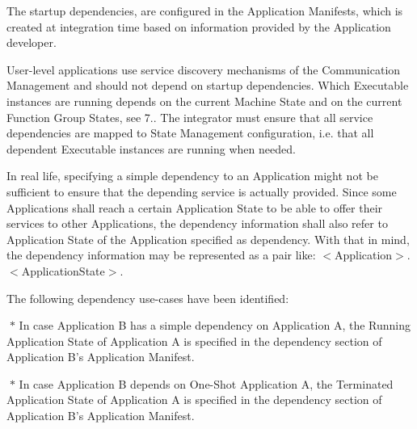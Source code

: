 \begin{DoxyItemize}
\begin{DoxyItemize}
The startup dependencies, are configured in the Application Manifests, which is created at integration time based on information provided by the Application developer.

User-\/level applications use service discovery mechanisms of the Communication Management and should not depend on startup dependencies. Which Executable instances are running depends on the current Machine State and on the current Function Group States, see 7.. The integrator must ensure that all service dependencies are mapped to State Management configuration, i.\+e. that all dependent Executable instances are running when needed.

In real life, specifying a simple dependency to an Application might not be sufficient to ensure that the depending service is actually provided. Since some Applications shall reach a certain Application State to be able to offer their services to other Applications, the dependency information shall also refer to Application State of the Application specified as dependency. With that in mind, the dependency information may be represented as a pair like\+: $<$\+Application$>$.$<$\+Application\+State$>$.

The following dependency use-\/cases have been identified\+:

$\ast$ In case Application B has a simple dependency on Application A, the Running Application State of Application A is specified in the dependency section of Application B’s Application Manifest.

$\ast$ In case Application B depends on One-\/\+Shot Application A, the Terminated Application State of Application A is specified in the dependency section of Application B’s Application Manifest.


\end{DoxyItemize}
\end{DoxyItemize}
